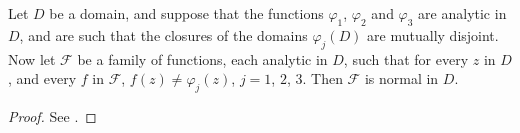 \begin{theorem}
    Let $D$ be a domain, and suppose that the functions $\varphi_1$, $\varphi_2$
    and $\varphi_3$ are analytic in $D$, and are such that the closures of the
    domains $\varphi_j(D)$ are mutually disjoint. Now let $\mathcal{F}$ be a
    family of functions, each analytic in $D$, such that for every $z$ in $D$,
    and every $f$ in $\mathcal{F}$, $f(z) \neq \varphi_j(z)$, $j = 1$, $2$, $3$.
    Then $\mathcal{F}$ is normal in $D$.
\end{theorem}
\begin{proof}
    See \cite[58]{Beardon1991}.
\end{proof}